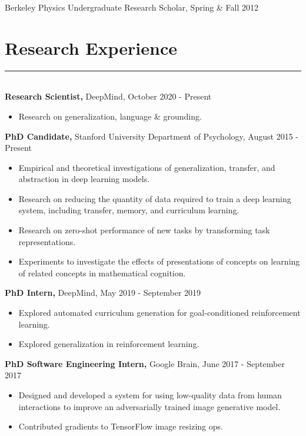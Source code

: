 \documentclass[margin]{res}
\begin{document}
\begin{resume}
Berkeley Physics Undergraduate Research Scholar, Spring \& Fall 2012
\vspace{1pt}\section{Research Experience} \vspace{-15pt} \rule{\textwidth}{0.5pt} \\[3pt]
{\bf Research Scientist,} DeepMind, October 2020 - Present 
\begin{itemize} \itemsep -2pt
  \item Research on generalization, language \& grounding. 
\end{itemize}\vspace{-8pt}
{\bf PhD Candidate,} Stanford University Department of Psychology, August 2015 - Present 
\begin{itemize} \itemsep -2pt
  \item Empirical and theoretical investigations of generalization, transfer, and abstraction in deep learning models. 
  \item Research on reducing the quantity of data required to train a deep learning system, including transfer, memory, and curriculum learning.
  \item Research on zero-shot performance of new tasks by transforming task representations.
  \item Experiments to investigate the effects of presentations of concepts on learning of related concepts in mathematical cognition.
\end{itemize}\vspace{-8pt}
{\bf PhD Intern,} DeepMind, May 2019 - September 2019
\begin{itemize} \itemsep -2pt
  \item Explored automated curriculum generation for goal-conditioned reinforcement learning.
  \item Explored generalization in reinforcement learning.
\end{itemize}\vspace{-8pt}
{\bf PhD Software Engineering Intern,} Google Brain, June 2017 - September 2017 
\begin{itemize} \itemsep -2pt
  \item Designed and developed a system for using low-quality data from human interactions to improve an adversarially trained image generative model. 
  \item Contributed gradients to TensorFlow image resizing ops.

\end{itemize}
\end{resume}
\end{document}
